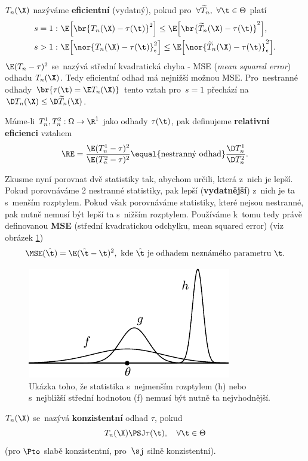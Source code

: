 \begin{define}
	$T_n(\X)$ nazýváme \textbf{eficientní} (vydatný), pokud pro~$\forall\widetilde{T}_n,~\forall\t\in\Theta$ platí \[
	\begin{split}
	s=1:~&\E\Big[\br{T_n(\X)-\tau(\t)}^2\Big]\leq \E\Big[\br{\widetilde{T}_n(\X)-\tau(\t)}^2\Big], \\
	s>1:~&\E\Big[\nor{T_n(\X)-\tau(\t)}_{\epsilon}^2\Big]\leq \E\Big[\nor{\widetilde{T}_n(\X)-\tau(\t)}_{\epsilon}^2\Big].
	\end{split}
	\]  
	$\E(T_n-\tau)^2$ se~nazývá střední kvadratická chyba - MSE (\textit{mean squared error}) odhadu $T_n(\X)$. Tedy eficientní odhad má nejnižší možnou MSE. Pro~nestranné odhady $\br{\tau(\t)=\E T_n(\X)}$ tento vztah pro~$s=1$ přechází na~$\D T_n(\X)\leq \D \widetilde{T}_n(\X)$.
\end{define}

\begin{define}
	Máme-li $T_n^1,T_n^2:\Omega\to\R^1$ jako odhady $\tau(\t)$, pak definujeme \textbf{relativní eficienci} vztahem $$\RE=\frac{\E(T_n^1-\tau)^2}{\E(T_n^2-\tau)^2}\equal{\text{nestranný odhad}}\frac{\D T_n^1}{\D T_n^2}.$$
\end{define}


Zkusme nyní porovnat dvě statistiky tak, abychom určili, která z~nich je lepší. Pokud porovnáváme 2 nestranné statistiky, pak lepší (\textbf{vydatnější}) z~nich je ta s~menším rozptylem. Pokud však porovnáváme statistiky, které nejsou nestranné, pak nutně nemusí být lepší ta s~nižším rozptylem. Používáme k~tomu tedy právě definovanou \textbf{MSE} (střední kvadratickou odchylku, mean squared error) (viz obrázek \ref{fig:mse}) $$ \MSE(\hat{\t})=\E(\hat{\t}-\t)^2,\text{ kde $\hat{\t}$ je odhadem neznámého parametru $\t$.} $$
\begin{figure}[h]
	\centering
	\includegraphics[width=0.4\linewidth]{Images/MSE}
	\caption{Ukázka toho, že statistika s~nejmenším rozptylem (h) nebo s~nejbližší střední hodnotou (f) nemusí být nutně ta nejvhodnější.}
	\label{fig:mse}
\end{figure}

\begin{define}
	$T_n(\X)$ se~nazývá \textbf{konzistentní} odhad $\tau$, pokud $$T_n(\X)\PSJ\tau(\t),\quad\forall\t\in\Theta$$ (pro $\Pto$ slabě konzistentní, pro~$\sj$ silně konzistentní).
\end{define}


